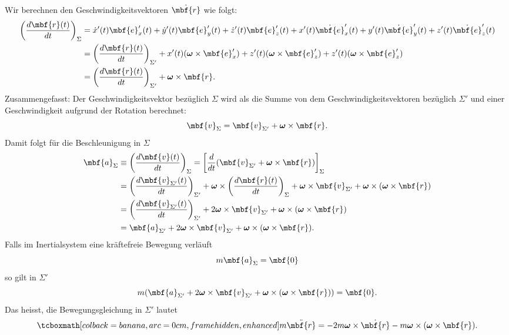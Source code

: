 \begin{enumerate}
Wir berechnen den Geschwindigkeitsvektoren $\dot{\mbf{r}}$ wie folgt:
\begin{equation}
  \begin{split}
    \left(\frac{d\mbf{r}(t)}{dt}\right)_{\Sigma} &= \dot{x}'(t) \mbf{e}_x'(t) + \dot{y}'(t) \mbf{e}_y'(t) + \dot{z}'(t) \mbf{e}_z'(t) + x'(t) \dot{\mbf{e}}_x'(t) + y'(t) \dot{\mbf{e}}_y'(t) + z'(t) \dot{\mbf{e}}_z'(t) \\
    &= \left(\frac{d\mbf{r}(t)}{dt}\right)_{\Sigma'} + x'(t)(\boldsymbol{\omega}\times \mbf{e}_x') +z'(t)(\boldsymbol{\omega}\times \mbf{e}_z')+z'(t)(\boldsymbol{\omega}\times \mbf{e}_z') \\
    &= \left(\frac{d\mbf{r}(t)}{dt}\right)_{\Sigma'} + \boldsymbol{\omega}\times \mbf{r}.
  \end{split}
\end{equation}
Zusammengefasst: Der Geschwindigkeitsvektor bezüglich $\Sigma$ wird als die Summe von dem Geschwindigkeitsvektoren bezüglich $\Sigma'$ und einer Geschwindigkeit aufgrund der Rotation berechnet:
\begin{equation}
  \mbf{v}_{\Sigma} = \mbf{v}_{\Sigma'} + \boldsymbol{\omega}\times \mbf{r}.
\end{equation}
Damit folgt für die Beschleunigung in $\Sigma$
\begin{equation}
  \begin{split}
    \mbf{a}_{\Sigma} &\equiv \left(\frac{d\mbf{v}(t)}{dt}\right)_{\Sigma} = \left[\frac{d}{dt}(\mbf{v}_{\Sigma'} + \boldsymbol{\omega}\times \mbf{r})\right]_{\Sigma} \\
    &= \left(\frac{d\mbf{v}_{\Sigma'}(t)}{dt}\right)_{\Sigma'} + \boldsymbol{\omega}\times \left(\frac{d\mbf{r}(t)}{dt}\right)_{\Sigma} + \boldsymbol{\omega}\times \mbf{v}_{\Sigma'} + \boldsymbol{\omega}\times (\boldsymbol{\omega}\times \mbf{r}) \\
    &= \left(\frac{d\mbf{v}_{\Sigma'}(t)}{dt}\right)_{\Sigma'} + 2\boldsymbol{\omega}\times \mbf{v}_{\Sigma'}  + \boldsymbol{\omega}\times (\boldsymbol{\omega}\times \mbf{r})\\
    &= \mbf{a}_{\Sigma'} + 2\boldsymbol{\omega}\times \mbf{v}_{\Sigma'}  + \boldsymbol{\omega}\times (\boldsymbol{\omega}\times \mbf{r}).
  \end{split}
\end{equation}
Falls im Inertialsystem eine kräftefreie Bewegung verläuft
\begin{equation}
  m\mbf{a}_{\Sigma} = \mbf{0}
\end{equation}
so gilt in $\Sigma'$
\begin{equation}
  m(\mbf{a}_{\Sigma'} + 2\boldsymbol{\omega}\times \mbf{v}_{\Sigma'}  + \boldsymbol{\omega}\times (\boldsymbol{\omega}\times \mbf{r})) = \mbf{0}.
\end{equation}
Das heisst, die Bewegungsgleichung in $\Sigma'$ lautet
\begin{equation}
  \eqbox{m\ddot{\mbf{r}} = -2m\boldsymbol{\omega}\times \dot{\mbf{r}} - m\boldsymbol{\omega}\times (\boldsymbol{\omega}\times \mbf{r}).}
\end{equation}
\end{enumerate}

